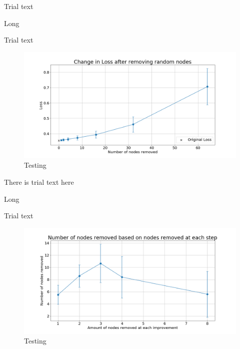 \documentclass[UKenglish]{ifimaster}
\begin{document}
            Trial text

            \begin{table}[h!]
                \centering
                \resizebox{\textwidth}{!}{}
                \caption[Short]{Long}
                \label{tab:loss_rnd_rem_fmnist}
            \end{table}

            Trial text

            \begin{figure}[h!]\centering
                \includegraphics[width=\textwidth]{Loss_change_random_removal_fmnist.png}
                \caption[Short title]{Testing}
                \label{fig:loss_rn_fmnist}
            \end{figure}

            There is trial text here

            \begin{table}[h!]
                \centering
                \resizebox{\textwidth}{!}{}
                \caption[Short]{Long}
                \label{tab:nr_rnd_rem_imp_fmnist}
            \end{table}

            Trial text

            \begin{figure}[h!]\centering
                \includegraphics[width=\textwidth]{Num_rem_vs_size_removed_fmnist.png}
                \caption[Short title]{Testing}
                \label{fig:num_rem_rn_imp_fmnist}
            \end{figure}
\end{document}
